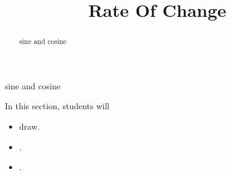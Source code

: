 \documentclass{ximera}
\title{Rate Of Change}
\begin{document}
\begin{abstract}
sine and cosine
\end{abstract}
\maketitle




sine and cosine

\begin{sectionOutcomes}
In this section, students will 

\begin{itemize}
\item draw.
\item .
\item .
\end{itemize}
\end{sectionOutcomes}
\end{document}
